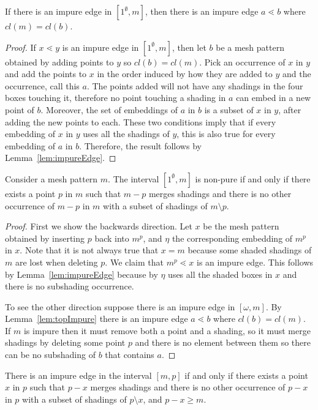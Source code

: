 \documentclass[11pt,a4paper,oneside]{article}
\begin{document}
\begin{lem}\label{lem:topImpure}
If there is an impure edge in $[1^\emptyset,m]$, then there is an impure edge
$a\lessdot b$ where $cl(m)=cl(b)$.
\begin{proof}
If $x\lessdot y$ is an impure edge in $[1^\emptyset,m]$, then let $b$ be a mesh
pattern obtained by adding points to $y$ so $cl(b) = cl(m)$. Pick
an occurrence of $x$ in $y$ and add the points to $x$ in the order induced by
how they are added to $y$ and the occurrence, call this $a$. The points added
will not have any shadings in the four boxes touching it, therefore no point
touching a shading in $a$ can embed in a new point of $b$. Moreover, the set of
embeddings of $a$ in $b$ is a subset of $x$ in $y$, after adding the new points
to each. These two conditions imply that if every embedding of $x$ in $y$ uses
all the shadings of $y$, this is also true for every embedding of $a$ in $b$.
Therefore, the result follows by Lemma~\ref{lem:impureEdge}.
\end{proof}
\end{lem}

\begin{prop}
Consider a mesh pattern $m$. The interval $[1^\emptyset,m]$ is non-pure if and
only if there exists a point $p$ in $m$ such that $m-p$ merges shadings and
there is no other occurrence of $m-p$ in $m$ with a subset of shadings of
$m\setminus p$.
\begin{proof}
First we show the backwards direction. Let $x$  be the mesh pattern obtained by
inserting $p$ back into $m^p$, and $\eta$ the corresponding embedding of $m^p$
in $x$. Note that it is not always true that $x=m$ because some shaded shadings
of $m$ are lost when deleting $p$. We claim that $m^p\lessdot x$ is an impure
edge. This follows by Lemma~\ref{lem:impureEdge} because by $\eta$ uses all the
shaded boxes in $x$ and there is no subshading occurrence.

To see the other direction suppose there is an impure edge in $[\omega,m]$. By
Lemma~\ref{lem:topImpure} there is an impure edge $a\lessdot b$ where
$cl(b)=cl(m)$. If $m$ is impure then it must remove both a point and a shading,
so it must merge shadings by deleting some point $p$ and there is no element
between them so there can be no subshading of $b$ that contains $a$.
\end{proof}
\end{prop}

\begin{cor}
There is an impure edge in the interval $[m,p]$ if and only if there exists a
point $x$ in $p$ such that $p-x$ merges shadings and there is no other
occurrence of $p-x$ in $p$ with a subset of shadings of $p\setminus x$, and
$p-x\ge m$.
\end{cor}
\end{document}

